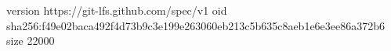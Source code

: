 version https://git-lfs.github.com/spec/v1
oid sha256:f49e02baca492f4d73b9c3e199e263060eb213c5b635c8aeb1e6e3ee86a372b6
size 22000
